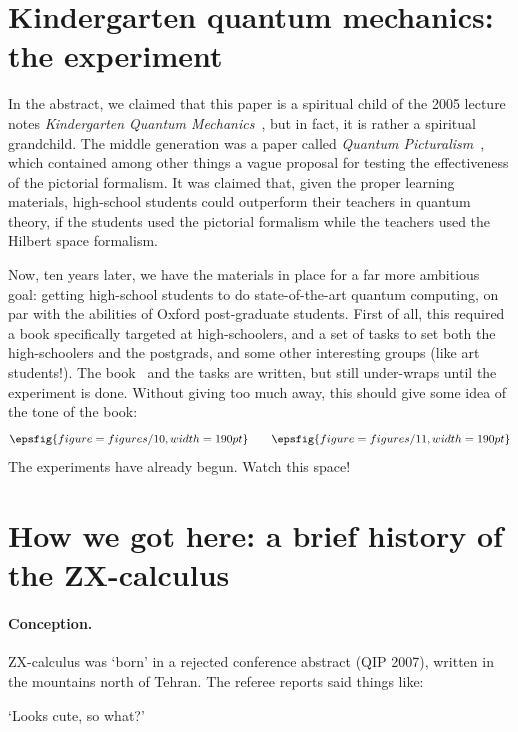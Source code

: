 \documentclass[11pt]{article}
\theoremstyle{definition}
\begin{document}
{\section{Kindergarten quantum mechanics: the experiment}\label{sec:exp}

In the abstract, we claimed that this paper is a spiritual child of the 2005 lecture notes \textit{Kindergarten Quantum Mechanics}~\cite{Kindergarten}, but in fact, it is rather a spiritual grandchild. The middle generation was a paper called \textit{Quantum Picturalism}~\cite{ContPhys}, which contained among other things a vague proposal for testing the effectiveness of the pictorial formalism.  It was claimed that, given the proper learning materials, high-school students could outperform their teachers in quantum theory, if the students used the pictorial formalism while the teachers used the Hilbert space formalism.

Now, ten years later, we have the materials in place for a far more ambitious goal: getting high-school students to do state-of-the-art quantum computing, on par with the abilities of Oxford post-graduate students.  First of all, this required a book specifically targeted at high-schoolers, and a set of tasks to set both the high-schoolers and the postgrads, and some other interesting groups (like art students!). The book~\cite{CoeckeGogioso2018} and the tasks are written, but still under-wraps until the experiment is done. Without giving too much away, this should give some idea of the tone of the book:
\[
\epsfig{figure=figures/10,width=190pt}
\qquad
\epsfig{figure=figures/11,width=190pt}
\]
The experiments have already begun. Watch this space!

\section{How we got here: a brief history of the ZX-calculus}\label{sec:furtherrefs}%

\paragraph{Conception.} ZX-calculus was `born' in a rejected conference abstract \cite{CD0} (QIP 2007), written in the mountains north of Tehran.  The referee reports said things like:
\begin{center}
`Looks cute, so what?'
\end{center}

}
\end{document}
